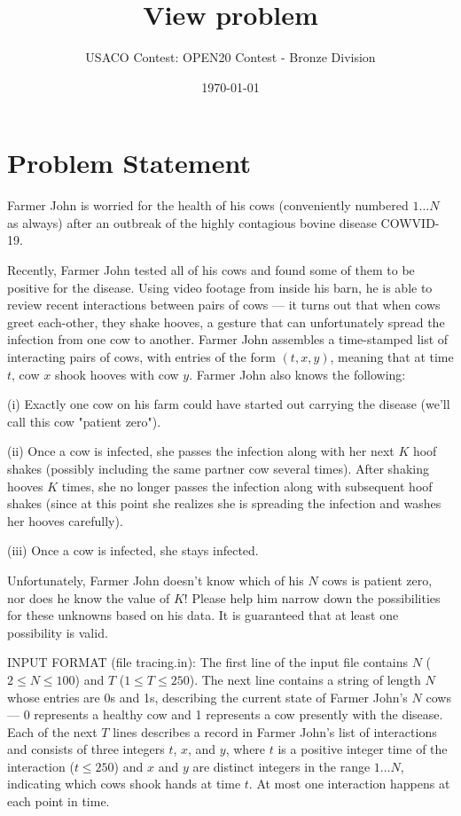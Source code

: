 \documentclass[12pt]{article}
\title{View problem}
\author{USACO Contest: OPEN20 Contest - Bronze Division}
\date{\today}
\begin{document}
\maketitle

\section*{Problem Statement}

Farmer John is worried for the health of his cows (conveniently numbered
$1 \ldots N$ as always) after an outbreak of the  highly contagious bovine
disease COWVID-19.  

Recently, Farmer John tested all of his cows and found some of them to be 
positive for the disease.  Using video footage from inside his barn, he is able
to review recent interactions between pairs of cows --- it turns out that when
cows greet each-other, they shake hooves, a gesture that can unfortunately
spread the infection from one cow to another.  Farmer John assembles a
time-stamped list of interacting pairs of cows, with entries of the form
$(t, x, y)$, meaning that at time $t$, cow $x$ shook hooves with cow $y$. 
Farmer John also knows the following:

(i) Exactly one cow on his farm could have started out carrying the disease
(we'll call this cow "patient zero").

(ii) Once a cow is infected, she passes the infection along with her next $K$
hoof shakes (possibly including the same partner cow several times).  After 
shaking hooves $K$ times, she no longer passes the infection along with 
subsequent hoof shakes (since at this point she realizes she is spreading the
infection and washes her hooves carefully).

(iii) Once a cow is infected, she stays infected.

Unfortunately, Farmer John doesn't know which of his $N$ cows is patient zero,
nor does he know the value of $K$!  Please help him narrow down the
possibilities for these unknowns based on his data. It is guaranteed that at
least one possibility is valid.

INPUT FORMAT (file tracing.in):
The first line of the input file contains $N$ ($2 \leq N \leq 100$) and $T$
($1 \leq T \leq 250$).  The next line contains a string of length $N$ whose
entries are 0s and 1s,  describing the current state of Farmer John's $N$ cows
--- 0 represents a healthy cow and 1 represents a cow presently with the
disease.  Each of the next $T$ lines describes a record in Farmer John's list of
interactions and consists of three integers $t$, $x$, and $y$, where $t$ is a
positive integer time of the interaction ($t \leq 250$) and $x$ and $y$ are
distinct integers in the range $1 \ldots N$, indicating which cows shook hands
at time $t$. At most one interaction happens at each point in time. 
\end{document}
